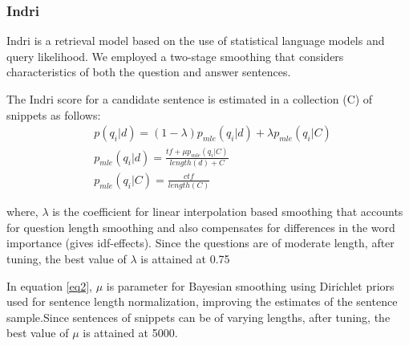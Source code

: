 \documentclass[11pt,a4paper]{article}
\begin{document}



\subsubsection{Indri}

Indri \cite{Indri} is a retrieval model based on the use of statistical language models and query likelihood. 
We employed a two-stage smoothing that considers characteristics of both the question and answer sentences. 

The Indri score for a candidate sentence is estimated in a collection (C) of snippets as follows:
\begin{align}
    & p(q_i|d) = (1-\lambda) p_{mle} (q_i|d) + \lambda p_{mle} (q_i|C) \label{eq1} \\ 
    & p_{mle}(q_i|d) = 
    \frac{tf + \mu  p_{mle}(q_i|C)}{length(d) + C} \label{eq2} \\ 
    & p_{mle}(q_i | C) = \frac{ctf}{length(C)}
\end{align}

where, $\lambda$ is the coefficient for linear interpolation based smoothing that accounts for question length smoothing and also compensates for differences in the word importance (gives idf-effects). Since the questions are of moderate length, after tuning, the best value of $\lambda$ is attained at 0.75

In equation \ref{eq2}, $\mu$ is parameter for Bayesian smoothing using Dirichlet priors used for sentence length normalization, improving the estimates of the sentence sample.Since sentences of snippets can be of varying lengths, after tuning, the best value of $\mu$ is attained at 5000.
\end{document}

